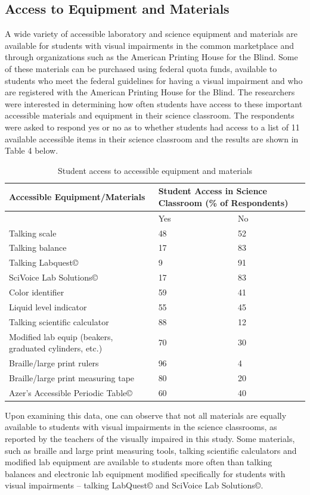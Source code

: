 \documentclass[11.5pt]{sig-alternate} %
\begin{document}
\begin{large}
\subsection*{Access to Equipment and Materials}

A wide variety of accessible laboratory and science equipment and materials are available for students with visual impairments in the common marketplace and through organizations such as the American Printing House for the Blind.  Some of these materials can be purchased using federal quota funds, available to students who meet the federal guidelines for having a visual impairment and who are registered with the American Printing House for the Blind.  The researchers were interested in determining how often students have access to these important accessible materials and equipment in their science classroom.  The respondents were asked to respond yes or no as to whether students had access to a list of 11 available accessible items in their science classroom and the results are shown in Table 4 below.

\begin{table}[t]
\caption{Student access to accessible equipment and materials}
\begin{tabular}{lll}
\hline
Accessible Equipment/Materials & \multicolumn{2}{l}{Student Access in Science Classroom (\% of Respondents)}  \\ \hline
 & Yes & No \\
\cline{2-3}
Talking scale & 48 & 52 \\
Talking balance & 17 & 83 \\
Talking Labquest© & 9 & 91 \\
SciVoice Lab Solutions© & 17 & 83 \\
Color identifier & 59 & 41 \\
Liquid level indicator & 55 & 45 \\
Talking scientific calculator & 88 & 12 \\
Modified lab equip (beakers, graduated cylinders, etc.) & 70 & 30 \\
Braille/large print rulers & 96 & 4 \\
Braille/large print measuring tape & 80 & 20 \\
Azer’s Accessible Periodic Table© & 60 & 40 \\
\hline
\end{tabular}
\end{table}

Upon examining this data, one can observe that not all materials are equally available to students with visual impairments in the science classrooms, as reported by the teachers of the visually impaired in this study.  Some materials, such as braille and large print measuring tools, talking scientific calculators and modified lab equipment are available to students more often than talking balances and electronic lab equipment modified specifically for students with visual impairments – talking LabQuest© and SciVoice Lab Solutions©.  



\end{large}
\end{document}
